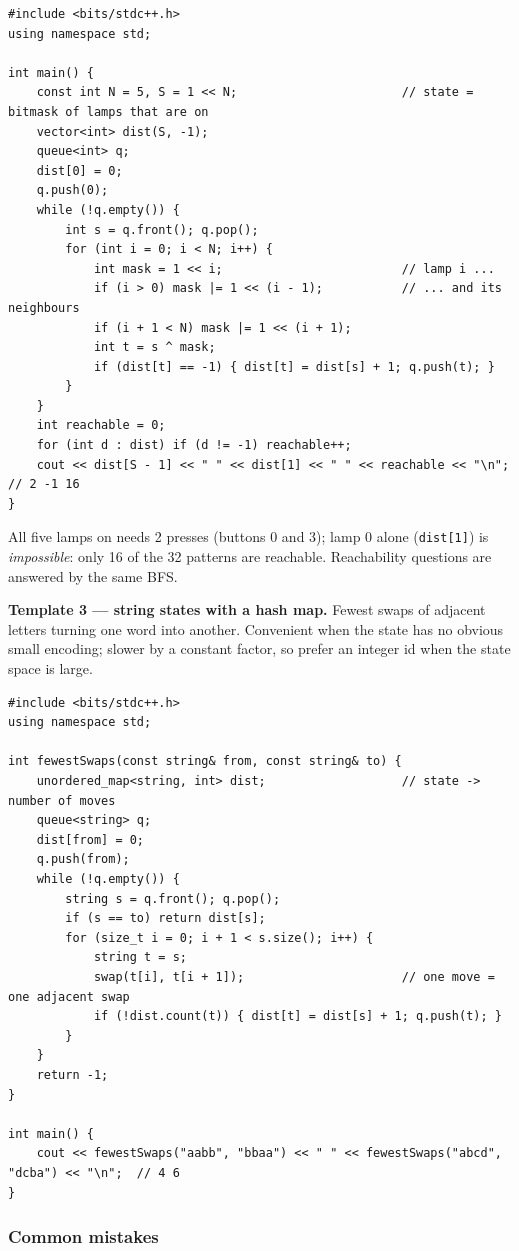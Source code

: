 \begin{lstlisting}[style=cpp]
#include <bits/stdc++.h>
using namespace std;

int main() {
    const int N = 5, S = 1 << N;                       // state = bitmask of lamps that are on
    vector<int> dist(S, -1);
    queue<int> q;
    dist[0] = 0;
    q.push(0);
    while (!q.empty()) {
        int s = q.front(); q.pop();
        for (int i = 0; i < N; i++) {
            int mask = 1 << i;                         // lamp i ...
            if (i > 0) mask |= 1 << (i - 1);           // ... and its neighbours
            if (i + 1 < N) mask |= 1 << (i + 1);
            int t = s ^ mask;
            if (dist[t] == -1) { dist[t] = dist[s] + 1; q.push(t); }
        }
    }
    int reachable = 0;
    for (int d : dist) if (d != -1) reachable++;
    cout << dist[S - 1] << " " << dist[1] << " " << reachable << "\n";   // 2 -1 16
}
\end{lstlisting}
All five lamps on needs 2 presses (buttons 0 and 3); lamp 0 alone (\texttt{dist[1]}) is \emph{impossible}: only 16 of the 32 patterns are reachable. Reachability questions are answered by the same BFS.

\textbf{Template 3 --- string states with a hash map.} Fewest swaps of adjacent letters turning one word into another. Convenient when the state has no obvious small encoding; slower by a constant factor, so prefer an integer id when the state space is large.

\begin{lstlisting}[style=cpp]
#include <bits/stdc++.h>
using namespace std;

int fewestSwaps(const string& from, const string& to) {
    unordered_map<string, int> dist;                   // state -> number of moves
    queue<string> q;
    dist[from] = 0;
    q.push(from);
    while (!q.empty()) {
        string s = q.front(); q.pop();
        if (s == to) return dist[s];
        for (size_t i = 0; i + 1 < s.size(); i++) {
            string t = s;
            swap(t[i], t[i + 1]);                      // one move = one adjacent swap
            if (!dist.count(t)) { dist[t] = dist[s] + 1; q.push(t); }
        }
    }
    return -1;
}

int main() {
    cout << fewestSwaps("aabb", "bbaa") << " " << fewestSwaps("abcd", "dcba") << "\n";  // 4 6
}
\end{lstlisting}

\subsubsection*{Common mistakes}

